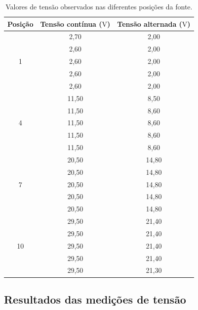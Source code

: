 \documentclass[a4paper,12pt]{article}
\begin{document}
\begin{table}[H]
  \centering
  \caption{Valores de tensão observados nas diferentes posições da fonte.}
  \label{tab:medicoes_tensao}
  \medskip

  \begin{tabular}{ccc}
    \toprule
    {\textbf{Posição}}
    & {\textbf{Tensão contínua} ($\mathrm{V}$)}
    & {\textbf{Tensão alternada} ($\mathrm{V}$)} \\
    \midrule
    \multirow{5}{*}{1}
      & 2,70  & 2,00 \\
      & 2,60  & 2,00 \\
      & 2,60  & 2,00 \\
      & 2,60  & 2,00 \\
      & 2,60  & 2,00 \\
    \midrule
    \multirow{5}{*}{4}
      & 11,50 & 8,50 \\
      & 11,50 & 8,60 \\
      & 11,50 & 8,60 \\
      & 11,50 & 8,60 \\
      & 11,50 & 8,60 \\
    \midrule
    \multirow{5}{*}{7}
      & 20,50 & 14,80 \\
      & 20,50 & 14,80 \\
      & 20,50 & 14,80 \\
      & 20,50 & 14,80 \\
      & 20,50 & 14,80 \\
    \midrule
    \multirow{5}{*}{10}
      & 29,50 & 21,40 \\
      & 29,50 & 21,40 \\
      & 29,50 & 21,40 \\
      & 29,50 & 21,40 \\
      & 29,50 & 21,30 \\
    \bottomrule
  \end{tabular}
\end{table}

\subsection{Resultados das medições de tensão}
\end{document}
